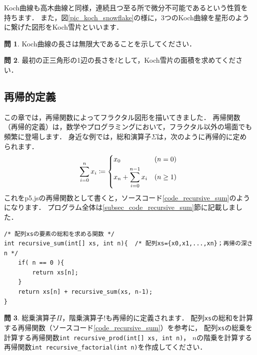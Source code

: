 \documentclass[dvipdfmx]{jsarticle}
\theoremstyle{definition}
\newtheorem{question}{問}[section]
\begin{document}
Koch曲線も高木曲線と同様，連続且つ至る所で微分不可能であるという性質を持ちます．
また，図\ref{pic_koch_snowflake}の様に，3つのKoch曲線を星形のように繋げた図形をKoch雪片といいます．

\begin{question}
    Koch曲線の長さは無限大であることを示してください．
\end{question}

\begin{question}
    最初の正三角形の1辺の長さを$l$として，Koch雪片の面積を求めてください．
\end{question}

\subsection{再帰的定義}  \label{subsec_recursion}
この章では，再帰関数によってフラクタル図形を描いてきました．
再帰関数（再帰的定義）は，数学やプログラミングにおいて，フラクタル以外の場面でも頻繁に登場します．
身近な例では，総和演算子$\Sigma$は，次のように再帰的に定められます．
%
\begin{align*}
    \sum_{i=0}^{n} x_i \coloneqq
        \begin{dcases}
            x_0 & (n = 0) \\
            x_n + \sum_{i=0}^{n-1} x_i & (n \geq 1)
        \end{dcases}
\end{align*}
%
これをp5.jsの再帰関数として書くと，ソースコード\ref{code_recursive_sum}のようになります．
プログラム全体は\ref{subsec_code_recursive_sum}節に記載しました．
%
\begin{lstlisting}[caption=総和を計算する再帰関数, label=code_recursive_sum]
/* 配列xsの要素の総和を求める関数 */
int recursive_sum(int[] xs, int n){  /* 配列xs={x0,x1,...,xn}；再帰の深さn */
    if( n == 0 ){
        return xs[n];
    }
    return xs[n] + recursive_sum(xs, n-1);
}
\end{lstlisting}

\begin{question}
    総乗演算子$\Pi$，階乗演算子$!$も再帰的に定義されます．
    配列\verb|xs|の総和を計算する再帰関数（ソースコード\ref{code_recursive_sum}）を参考に，
    配列\verb|xs|の総乗を計算する再帰関数\verb|int recursive_prod(int[] xs, int n)|，
    $n$の階乗を計算する再帰関数\verb|int recursive_factorial(int n)|を作成してください．
\end{question}
\end{document}
